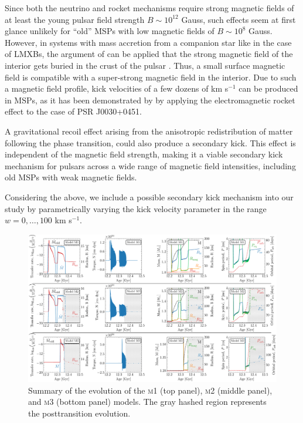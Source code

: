 \documentclass[main.tex]{subfiles}
\begin{document}
        Since both the neutrino and rocket mechanisms require strong magnetic fields of at least the young pulsar field strength $B\sim 10^{12}$ Gauss, such effects seem at first glance unlikely for ``old'' MSPs with low magnetic fields of
        $B\sim 10^{8}$ Gauss.
        However, in systems with mass accretion from a companion star like in the case of LMXBs, the argument of \cite{1989ApJ...346..847C} can be applied that the strong magnetic field of the interior gets buried in the crust of the pulsar \citep[e.g.,][and references therein]{Bhattacharya:1991pre, 2001ApJ...557..958C, 10.1111/j.1365-2966.2004.07397.x}.
        Thus, a small surface magnetic field is compatible with a super-strong magnetic field in the interior. 
        Due to such a magnetic field profile, kick velocities of a few dozens of km s$^{-1}$ can be produced in MSPs, as it has been demonstrated by \cite{Agalianou:2023lvv} by applying the electromagnetic rocket effect to the case of PSR J0030+0451.
        
        
        A gravitational recoil effect arising from the anisotropic redistribution of matter following the phase transition, could also produce a secondary kick.  This effect is independent of the magnetic field strength, making it a viable secondary kick mechanism for pulsars across a wide range of magnetic field intensities, including old MSPs with weak magnetic fields.
        
        Considering the above, we include a possible secondary kick mechanism into our study by parametrically varying the kick velocity parameter in the range $w=0, \dots, 100$ km s$^{-1}$.
        
        \begin{landscape}
        \begin{figure}[thb]
            \centering
            \includegraphics[width=\columnwidth,angle=0]{figures/chapter3/lmxb_grid.pdf}
            \caption{Summary of the evolution of the \textsc{m1} (top panel), \textsc{m2} (middle panel), and \textsc{m3} (bottom panel) models. The gray hashed region represents the posttransition evolution.}
            \label{fig:lmxb_grid}
        \end{figure}   
        \end{landscape}
    
\end{document}
